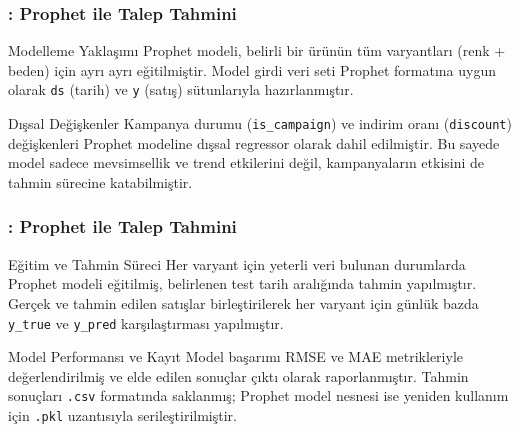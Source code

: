 \documentclass[12pt]{beamer}
\begin{document}
	\begin{frame}
		\frametitle{\insertsection: Prophet ile Talep Tahmini}
		\begin{block}{Modelleme Yaklaşımı}
			Prophet modeli, belirli bir ürünün tüm varyantları (renk + beden) için ayrı ayrı eğitilmiştir. Model girdi veri seti Prophet formatına uygun olarak \texttt{ds} (tarih) ve \texttt{y} (satış) sütunlarıyla hazırlanmıştır. 
		\end{block}
		
		\vspace{0.5em}
		
		\begin{block}{Dışsal Değişkenler}
			Kampanya durumu (\texttt{is\_campaign}) ve indirim oranı (\texttt{discount}) değişkenleri Prophet modeline dışsal regressor olarak dahil edilmiştir. Bu sayede model sadece mevsimsellik ve trend etkilerini değil, kampanyaların etkisini de tahmin sürecine katabilmiştir.
		\end{block}
	\end{frame}
	
	
	\begin{frame}
		\frametitle{\insertsection: Prophet ile Talep Tahmini}
		\begin{block}{Eğitim ve Tahmin Süreci}
			Her varyant için yeterli veri bulunan durumlarda Prophet modeli eğitilmiş, belirlenen test tarih aralığında tahmin yapılmıştır. Gerçek ve tahmin edilen satışlar birleştirilerek her varyant için günlük bazda \texttt{y\_true} ve \texttt{y\_pred} karşılaştırması yapılmıştır.
		\end{block}
		
		\vspace{0.5em}
		
		\begin{block}{Model Performansı ve Kayıt}
			Model başarımı RMSE ve MAE metrikleriyle değerlendirilmiş ve elde edilen sonuçlar çıktı olarak raporlanmıştır. Tahmin sonuçları \texttt{.csv} formatında saklanmış; Prophet model nesnesi ise yeniden kullanım için \texttt{.pkl} uzantısıyla serileştirilmiştir.
		\end{block}
	\end{frame}
	
\end{document}
